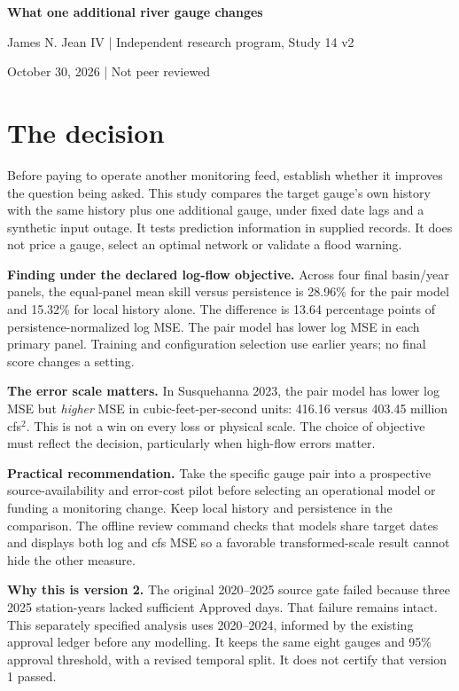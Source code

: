\documentclass[11pt]{article}
\newcommand{\LocalSkill}{15.32}
\newcommand{\PairSkill}{28.96}
\newcommand{\SkillDifference}{13.64}
\newcommand{\SusALocalCfsMse}{403.45}
\newcommand{\SusAPairCfsMse}{416.16}
\begin{document}
\begin{center}{\LARGE\bfseries What one additional river gauge changes}\par
\vspace{5pt}{\large A retrospective daily-discharge prediction exercise}\par
James N. Jean IV \quad | \quad Independent research program, Study 14 v2\par
October 30, 2026 \quad | \quad Not peer reviewed
\end{center}
\section*{The decision}
Before paying to operate another monitoring feed, establish whether it improves the question being asked. This study compares the target gauge's own history with the same history plus one additional gauge, under fixed date lags and a synthetic input outage. It tests prediction information in supplied records. It does not price a gauge, select an optimal network or validate a flood warning.

\textbf{Finding under the declared log-flow objective.} Across four final basin/year panels, the equal-panel mean skill versus persistence is \PairSkill{}\% for the pair model and \LocalSkill{}\% for local history alone. The difference is \SkillDifference{} percentage points of persistence-normalized log MSE. The pair model has lower log MSE in each primary panel. Training and configuration selection use earlier years; no final score changes a setting.

\textbf{The error scale matters.} In Susquehanna 2023, the pair model has lower log MSE but \emph{higher} MSE in cubic-feet-per-second units: \SusAPairCfsMse{} versus \SusALocalCfsMse{} million cfs$^2$. This is not a win on every loss or physical scale. The choice of objective must reflect the decision, particularly when high-flow errors matter.

\textbf{Practical recommendation.} Take the specific gauge pair into a prospective source-availability and error-cost pilot before selecting an operational model or funding a monitoring change. Keep local history and persistence in the comparison. The offline review command checks that models share target dates and displays both log and cfs MSE so a favorable transformed-scale result cannot hide the other measure.

\textbf{Why this is version 2.} The original 2020--2025 source gate failed because three 2025 station-years lacked sufficient Approved days. That failure remains intact. This separately specified analysis uses 2020--2024, informed by the existing approval ledger before any modelling. It keeps the same eight gauges and 95\% approval threshold, with a revised temporal split. It does not certify that version 1 passed.
\end{document}
